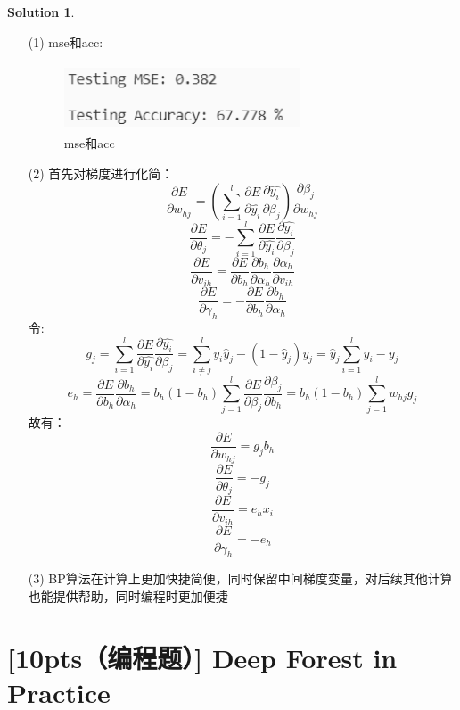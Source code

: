 \documentclass[a4paper,UTF8]{article}
\theoremstyle{definition}
\newtheorem*{solution}{Solution}
\begin{document}
\begin{solution}
	\begin{enumerate}
		\item [(1)]mse和acc:
		      \begin{figure}[h]
			      \centering
			      \includegraphics[width=7cm,height=2cm]{mse_and_acc.png}
			      \caption{mse和acc}
		      \end{figure}
		\item [(2)]首先对梯度进行化简：
		      \[\frac{\partial{E}}{\partial{w_{hj}}} = (\sum_{i=1}^{l}\frac{\partial{E}}{\partial{\hat{y_i}}}\frac{\partial{\hat{y_i}}}{\partial{\beta_j}})\frac{\partial{\beta_j}}{\partial{w_{hj}}}\]
		      \[\frac{\partial{E}}{\partial{\theta_j}} = -\sum_{i=1}^{l}\frac{\partial{E}}{\partial{\hat{y_i}}}\frac{\partial{\hat{y_i}}}{\partial{\beta_j}}\]
		      \[\frac{\partial{E}}{\partial{v_{ih}}} = \frac{\partial{E}}{\partial{b_h}}\frac{\partial{b_h}}{\partial{\alpha_h}}\frac{\partial{\alpha_h}}{\partial{v_{ih}}}\]
		      \[\frac{\partial{E}}{\partial{\gamma_h}} = - \frac{\partial{E}}{\partial{b_h}}\frac{\partial{b_h}}{\partial{\alpha_h}}\]
		      令:
		      \[g_j = \sum_{i=1}^{l}\frac{\partial{E}}{\partial{\hat{y_i}}}\frac{\partial{\hat{y_i}}}{\partial{\beta_j}} = \sum_{i\neq j}^{l}y_i\hat{y}_j - (1-\hat{y}_j)y_j = \hat{y}_j\sum_{i=1}^{l}y_i - y_j\]
		      \[e_h = \frac{\partial{E}}{\partial{b_h}}\frac{\partial{b_h}}{\partial{\alpha_h}} = b_h(1-b_h)\sum_{j=1}^{l}\frac{\partial{E}}{\partial{\beta_j}}\frac{\partial{\beta_j}}{\partial{b_h}} = b_h(1-b_h)\sum_{j=1}^{l}w_{hj}g_j\]
		      故有：
		      \[\frac{\partial{E}}{\partial{w_{hj}}} = g_jb_h\]
		      \[\frac{\partial{E}}{\partial{\theta_j}} = -g_j\]
		      \[\frac{\partial{E}}{\partial{v_{ih}}} = e_hx_i\]
		      \[\frac{\partial{E}}{\partial{\gamma_h}} = -e_h\]
		\item[(3)]BP算法在计算上更加快捷简便，同时保留中间梯度变量，对后续其他计算也能提供帮助，同时编程时更加便捷
	\end{enumerate}
\end{solution}


\section{[10pts（编程题）] Deep Forest in Practice}
\end{document}
